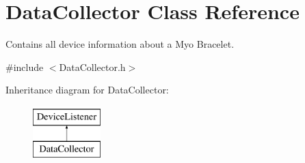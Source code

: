 \section{Data\+Collector Class Reference}
\label{class_data_collector}


Contains all device information about a Myo Bracelet.  




{\ttfamily \#include $<$Data\+Collector.\+h$>$}

Inheritance diagram for Data\+Collector\+:\begin{figure}[H]
\begin{center}
\leavevmode
\includegraphics[height=2.000000cm]{class_data_collector}
\end{center}
\end{figure}
